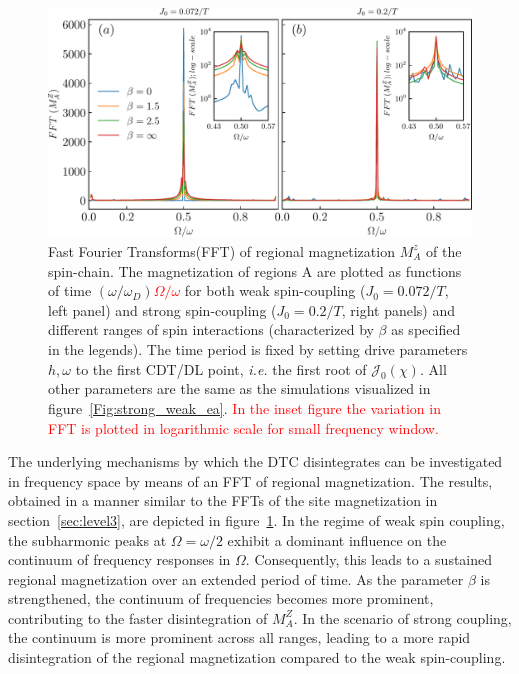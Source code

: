 \documentclass[12pt]{iopart}
\newcommand{\red}[1]{\textcolor{red}{#1}}
\begin{document}
\begin{figure}[t]
	\centering
	\hspace{1.5cm}\includegraphics[width = 13cm]{figure10.pdf}
	\caption{
		Fast Fourier Transforms(FFT) of regional magnetization $M^z_{A}$ of the spin-chain. The magnetization of regions A are plotted as functions of time \sout{$(\omega/\omega_D)$}\red{$\Omega/\omega$} for both weak spin-coupling ($J_0=0.072/T$, left panel) and strong spin-coupling ($J_0=0.2/T$, right panels) and different ranges of spin interactions (characterized by $\beta$ as specified in the legends). The time period is fixed by setting drive parameters $h,\omega$ to the first CDT/DL point, \textit{i.e.} the first root of $\mathcal{J}_0(\chi)$. All other parameters are the same as the simulations visualized in figure~\ref{Fig:strong_weak_ea}. \red{In the inset figure the variation in FFT is plotted in logarithmic scale for small frequency window.}}
	\label{Fig:regionalFFT}
\end{figure}
The underlying mechanisms by which the DTC disintegrates can be investigated in frequency space by means of an FFT of regional magnetization. The results, obtained in a manner similar to the FFTs of the site magnetization in section~\ref{sec:level3}, are depicted in figure~\ref{Fig:regionalFFT}. In the regime of weak spin coupling, the subharmonic peaks at $\Omega=\omega/2$ exhibit a dominant influence on the continuum of frequency responses in $\Omega$. Consequently, this leads to a sustained regional magnetization over an extended period of time. As the parameter $\beta$ is strengthened,  the continuum of frequencies becomes more prominent, contributing to the faster disintegration of $M^Z_A$. In the scenario of strong coupling, the continuum is more prominent across all ranges, leading to a more rapid disintegration of the regional magnetization compared to the weak spin-coupling.
\end{document}

